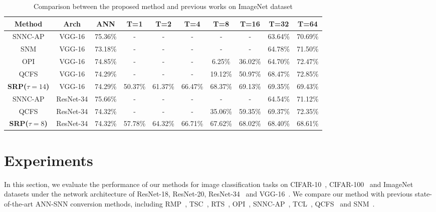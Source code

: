 \documentclass[letterpaper]{article} %
\begin{document}
\begin{table}[t]
    \caption{Comparison between the proposed method and previous works on ImageNet dataset}
    \renewcommand\arraystretch{1.15}
	\centering
	\begin{tabular}{cccccccccc}\hline

	Method & Arch & ANN & T=1 & T=2 & T=4 & T=8 & T=16 & T=32 & T=64 \\ \hline
	SNNC-AP & VGG-16 & 75.36\% & - & - & - & - & - & 63.64\% & 70.69\% \\\hline
	SNM & VGG-16 & 73.18\% & - & - & - & - & - & 64.78\% & 71.50\% \\\hline
	OPI & VGG-16 & 74.85\% & - & - & - & 6.25\% & 36.02\% & 64.70\% & 72.47\% \\\hline
	QCFS & VGG-16 & 74.29\% & - & - & - & 19.12\% & 50.97\% & 68.47\% & 72.85\% \\\hline

	\textbf{SRP($\tau=14$)} & VGG-16 & 74.29\% & 50.37\% & 61.37\% & 66.47\% & 68.37\% & 69.13\% & 69.35\% & 69.43\% \\ \hline
	SNNC-AP & ResNet-34 & 75.66\% & - & - & - & - & - & 64.54\% & 71.12\% \\\hline
	QCFS & ResNet-34 & 74.32\% & - & - & - & 35.06\% & 59.35\% & 69.37\% & 72.35\% \\\hline
	\textbf{SRP($\tau=8$)} & ResNet-34 & 74.32\% & 57.78\% & 64.32\% & 66.71\% & 67.62\% & 68.02\% & 68.40\% & 68.61\% \\ \hline
	\end{tabular}
	\label{table03}
\end{table}



\section{Experiments}
In this section, we evaluate the performance of our methods for image classification tasks on CIFAR-10~\cite{LeCun1998CIFAR10}, CIFAR-100~\cite{Krizhevsky2009CIFAR100} and ImageNet~\cite{Deng2009ImageNet} datasets under the network architecture of ResNet-18, ResNet-20, ResNet-34~\cite{he2016deep} and VGG-16~\cite{Simonyan2014VGG16}.
 We compare our method with previous state-of-the-art ANN-SNN conversion methods, including RMP~\cite{han2020rmp},
 TSC~\cite{Han&Roy2020},
 RTS~\cite{deng2020optimal},
 OPI~\cite{Bu2022OPI}, SNNC-AP~\cite{li2021free}, TCL~\cite{ho2021tcl}, QCFS~\cite{bu2022optimal} and SNM~\cite{wang2022signed}.
\end{document}

